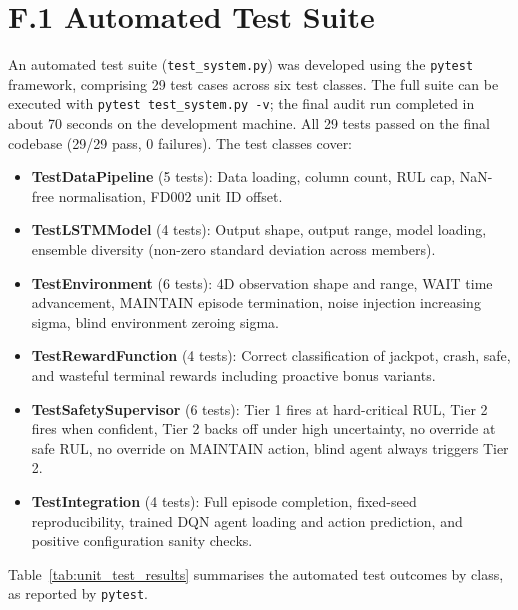 \documentclass[12pt,a4paper]{report}
\begin{document}
\section*{F.1 Automated Test Suite}

An automated test suite (\texttt{test\_system.py}) was developed using the \texttt{pytest} framework, comprising 29 test cases across six test classes. The full suite can be executed with \texttt{pytest test\_system.py -v}; the final audit run completed in about 70 seconds on the development machine. All 29 tests passed on the final codebase (29/29 pass, 0 failures). The test classes cover:

\begin{itemize}
    \item \textbf{TestDataPipeline} (5 tests): Data loading, column count, RUL cap, NaN-free normalisation, FD002 unit ID offset.
    \item \textbf{TestLSTMModel} (4 tests): Output shape, output range, model loading, ensemble diversity (non-zero standard deviation across members).
    \item \textbf{TestEnvironment} (6 tests): 4D observation shape and range, WAIT time advancement, MAINTAIN episode termination, noise injection increasing sigma, blind environment zeroing sigma.
    \item \textbf{TestRewardFunction} (4 tests): Correct classification of jackpot, crash, safe, and wasteful terminal rewards including proactive bonus variants.
    \item \textbf{TestSafetySupervisor} (6 tests): Tier 1 fires at hard-critical RUL, Tier 2 fires when confident, Tier 2 backs off under high uncertainty, no override at safe RUL, no override on MAINTAIN action, blind agent always triggers Tier 2.
    \item \textbf{TestIntegration} (4 tests): Full episode completion, fixed-seed reproducibility, trained DQN agent loading and action prediction, and positive configuration sanity checks.
\end{itemize}

Table~\ref{tab:unit_test_results} summarises the automated test outcomes by class, as reported by \texttt{pytest}.
\end{document}
